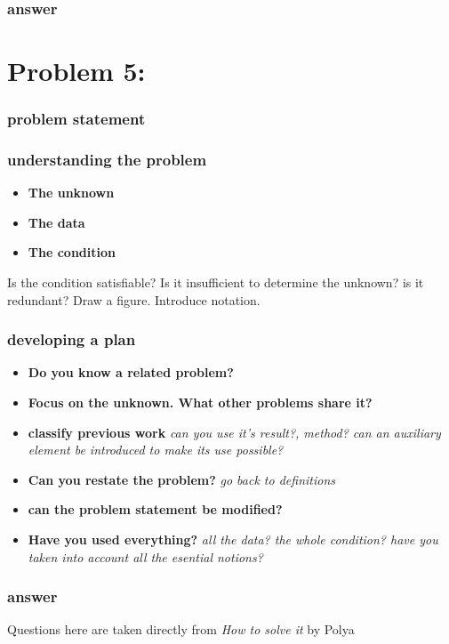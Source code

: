 \documentclass[11pt]{article}
\begin{document}
\subsubsection*{answer}

\section*{Problem 5:}

\subsubsection*{problem statement}

\subsubsection*{understanding the problem}

\begin{itemize}
 \item \textbf{The unknown}
 \item \textbf{The data} 
 \item \textbf{The condition} 
\end{itemize}

Is the condition satisfiable? Is it insufficient to determine the unknown? is it redundant?
Draw a figure. Introduce notation.

\subsubsection*{developing a plan}

\begin{itemize}
 \item \textbf{Do you know a related problem?}
 \item \textbf{Focus on the unknown. What other problems share it?}
 \item \textbf{classify previous work} \textit{can you use it's result?, method? can an auxiliary element be introduced to make its use possible?}
 \item \textbf{Can you restate the problem?} \textit{go back to definitions}
 \item \textbf{can the problem statement be modified?}
 \item \textbf{Have you used everything?} \textit{all the data? the whole condition? have you taken into account all the esential notions?}
\end{itemize}

\subsubsection*{answer}


Questions here are taken directly from \textit{How to solve it} by Polya
\end{document}
